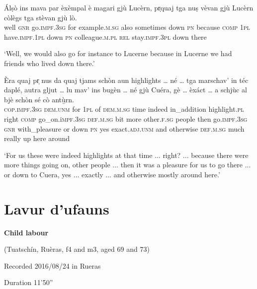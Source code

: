 \begin{linenumbers}
	\gll  Álṣò ins mava par èxèmpal è magari gjù Lucèrn, pr̩quaj tga nuṣ vèvan gjù Lucèrn còlègs tga stèvan gjù lò.\\
	well \textsc{gnr} go.\textsc{impf.3sg} for example\textsc{.m.sg} also sometimes down \textsc{pn} because \textsc{comp} \textsc{1pl} have.\textsc{impf.1pl} down \textsc{pn} colleague.\textsc{m.pl} \textsc{rel} stay.\textsc{impf.3pl} down there\\
\end{linenumbers}
\medskip
\glt `Well, we would also go for instance to Lucerne because in Lucerne we had friends who lived down there.'
\medskip

\begin{linenumbers}
	\gll  Èra quaj pr̩ nus da quaj tjams schòn aun highlights … né … tga marschav’ in téc daplé, autra gljut … lu mav’ ins bugèn … né gjù Cuéra, gè … èxáct … a schjùc al bjè schòn sé cò antù̱rn.\\
\textsc{cop.impf.3sg} \textsc{dem.unm} for \textsc{1pl} of \textsc{dem.m.sg} time indeed in\_addition highlight.\textsc{pl} {} right {} \textsc{comp} go\_on.i\textsc{mpf.3sg} \textsc{def.m.sg} bit more other.\textsc{f.sg} people {} then go.\textsc{impf.3sg} \textsc{gnr} with\_pleasure {} or down \textsc{pn} yes {} exact.\textsc{adj.unm} {} and otherwise \textsc{def.m.sg} much really up here around	\\
\end{linenumbers}
\medskip
\glt `For us these were indeed highlights at that time ... right? ... because there were more things going on, other people ... then it was a pleasure for us to go there ... or down to Cuera, yes ... exactly ... and otherwise mostly around here.'

\clearpage

\section{Lavur d'ufauns}\label{sec:8.16}

\noindent
\textbf{Child labour}

\noindent
(Tuatschín, Ruèras, f4 and m3, aged 69 and 73)

\noindent
Recorded 2016/08/24 in Rueras

\noindent
Duration 11'50''

\bigskip

